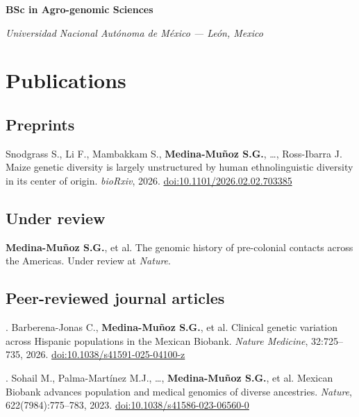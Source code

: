 \documentclass{tufte-handout}
\newcommand{\entry}[3]{%
  \noindent\textbf{#1}\par
  \noindent\textit{#2}\marginnote{#3}\par\smallskip
}
\begin{document}
\entry{BSc in Agro-genomic Sciences}{Universidad Nacional Aut\'onoma de M\'exico --- Le\'on, Mexico}{2013--2017}

\section*{Publications}

\begin{fullwidth}
\small

\subsection*{Preprints}
\noindent Snodgrass S., Li F., Mambakkam S., \textbf{Medina-Mu\~noz S.G.}, \ldots, Ross-Ibarra J. Maize genetic diversity is largely unstructured by human ethnolinguistic diversity in its center of origin. \textit{bioRxiv}, 2026. \href{https://doi.org/10.1101/2026.02.02.703385}{doi:10.1101/2026.02.02.703385}
\par\vspace{3pt}

\subsection*{Under review}
\noindent \textbf{Medina-Mu\~noz S.G.}, et al. The genomic history of pre-colonial contacts across the Americas. Under review at \textit{Nature}.
\par\vspace{3pt}

\subsection*{Peer-reviewed journal articles}
. Barberena-Jonas C., \textbf{Medina-Mu\~noz S.G.}, et al. Clinical genetic variation across Hispanic populations in the Mexican Biobank. \textit{Nature Medicine}, 32:725--735, 2026. \href{https://doi.org/10.1038/s41591-025-04100-z}{doi:10.1038/s41591-025-04100-z}
\par\vspace{3pt}

. Sohail M., Palma-Mart\'inez M.J., \ldots, \textbf{Medina-Mu\~noz S.G.}, et al. Mexican Biobank advances population and medical genomics of diverse ancestries. \textit{Nature}, 622(7984):775--783, 2023. \href{https://doi.org/10.1038/s41586-023-06560-0}{doi:10.1038/s41586-023-06560-0}
\par\vspace{3pt}


\end{fullwidth}
\end{document}
